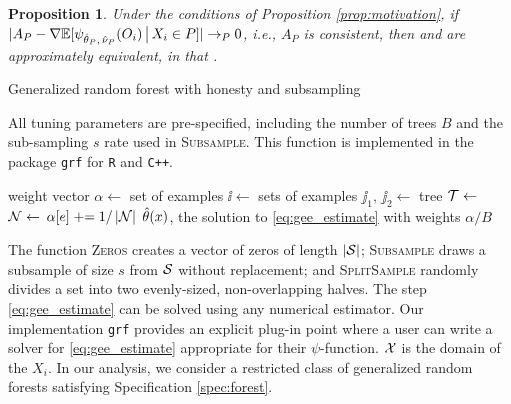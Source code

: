 \documentclass[aos]{imsart}
\theoremstyle{plain}
\newtheorem{prop}{Proposition}
\theoremstyle{definition}
\theoremstyle{remark}
\begin{document}
\begin{CJK}{UTF8}{gbsn}
{\begin{prop}
\label{prop:approximation}
Under the conditions of Proposition \ref{prop:motivation}, if 
$|A_P - \nabla \mathbb{E}[\psi_{\hat{\theta}_P, \, \hat{\nu}_P}(O_i) \,\big|\, X_i \in P]| \rightarrow_P 0$,
i.e., $A_P$ is consistent,
then  and  are approximately equivalent, in that
.
\end{prop}

\newcommand{\pluseq}{\mathrel{+}=}

\begin{algorithm}[t]
\caption{Generalized random forest with honesty and subsampling}\label{alg:forest}
\vspace{-0.4\baselineskip}
\justify
All tuning parameters are pre-specified, including the number of trees $B$ and the sub-sampling $s$ rate used in
\textsc{Subsample}. This function is implemented in the package \texttt{grf}
for \texttt{R} and \texttt{C++}.
\begin{algorithmic}[1]
\State weight vector $\alpha \gets$ 
\State set of examples $\ii \gets$ 
\State sets of examples $\jj_1, \, \jj_2 \gets$ 
\State tree $\mathcal{T} \gets$ 
\State $\mathcal{N} \gets $ 
\State $\alpha[{e}] \pluseq 1/\abs{\nn}$
\EndFor
\EndFor
{} $\hat{\theta}(x)$, the solution to \eqref{eq:gee_estimate} with weights $\alpha/B$
\EndProcedure
\end{algorithmic}
\justify
The function \textsc{Zeros} creates a vector of zeros of length $\left\lvert\mathcal{S}\right\rvert$;
\textsc{Subsample} draws a subsample of size $s$ from $\mathcal{S}$ without replacement; and
\textsc{SplitSample} randomly divides a set into two evenly-sized, non-overlapping halves.
The step \eqref{eq:gee_estimate} can be solved using any numerical estimator.
Our implementation \texttt{grf} provides an explicit plug-in point where a user can write
a solver for \eqref{eq:gee_estimate} appropriate for their $\psi$-function.
$\mathcal{X}$ is the domain of the $X_i$.
In our analysis, we consider a restricted class of generalized random forests satisfying
Specification \ref{spec:forest}.
\end{algorithm}


}
\end{CJK}
\end{document}
